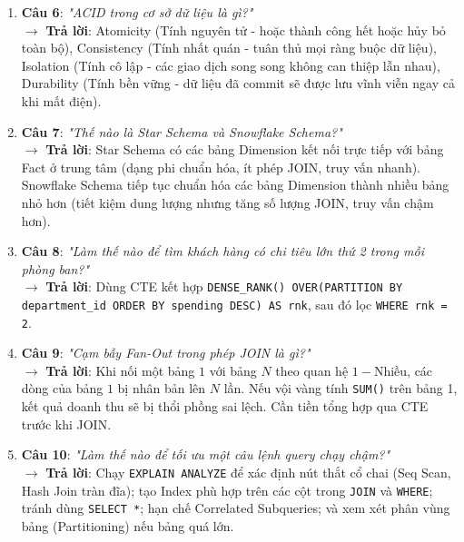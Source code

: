 \begin{enumerate}
    \item \textbf{Câu 6}: \textit{"ACID trong cơ sở dữ liệu là gì?"} \\
    $\rightarrow$ \textbf{Trả lời}: Atomicity (Tính nguyên tử - hoặc thành công hết hoặc hủy bỏ toàn bộ), Consistency (Tính nhất quán - tuân thủ mọi ràng buộc dữ liệu), Isolation (Tính cô lập - các giao dịch song song không can thiệp lẫn nhau), Durability (Tính bền vững - dữ liệu đã commit sẽ được lưu vĩnh viễn ngay cả khi mất điện).
    \item \textbf{Câu 7}: \textit{"Thế nào là Star Schema và Snowflake Schema?"} \\
    $\rightarrow$ \textbf{Trả lời}: Star Schema có các bảng Dimension kết nối trực tiếp với bảng Fact ở trung tâm (dạng phi chuẩn hóa, ít phép JOIN, truy vấn nhanh). Snowflake Schema tiếp tục chuẩn hóa các bảng Dimension thành nhiều bảng nhỏ hơn (tiết kiệm dung lượng nhưng tăng số lượng JOIN, truy vấn chậm hơn).
    \item \textbf{Câu 8}: \textit{"Làm thế nào để tìm khách hàng có chi tiêu lớn thứ 2 trong mỗi phòng ban?"} \\
    $\rightarrow$ \textbf{Trả lời}: Dùng CTE kết hợp \texttt{DENSE\_RANK() OVER(PARTITION BY department\_id ORDER BY spending DESC) AS rnk}, sau đó lọc \texttt{WHERE rnk = 2}.
    \item \textbf{Câu 9}: \textit{"Cạm bẫy Fan-Out trong phép JOIN là gì?"} \\
    $\rightarrow$ \textbf{Trả lời}: Khi nối một bảng $1$ với bảng $N$ theo quan hệ $1 - \text{Nhiều}$, các dòng của bảng $1$ bị nhân bản lên $N$ lần. Nếu vội vàng tính \texttt{SUM()} trên bảng 1, kết quả doanh thu sẽ bị thổi phồng sai lệch. Cần tiền tổng hợp qua CTE trước khi JOIN.
    \item \textbf{Câu 10}: \textit{"Làm thế nào để tối ưu một câu lệnh query chạy chậm?"} \\
    $\rightarrow$ \textbf{Trả lời}: Chạy \texttt{EXPLAIN ANALYZE} để xác định nút thắt cổ chai (Seq Scan, Hash Join tràn đĩa); tạo Index phù hợp trên các cột trong \texttt{JOIN} và \texttt{WHERE}; tránh dùng \texttt{SELECT *}; hạn chế Correlated Subqueries; và xem xét phân vùng bảng (Partitioning) nếu bảng quá lớn.
\end{enumerate}

